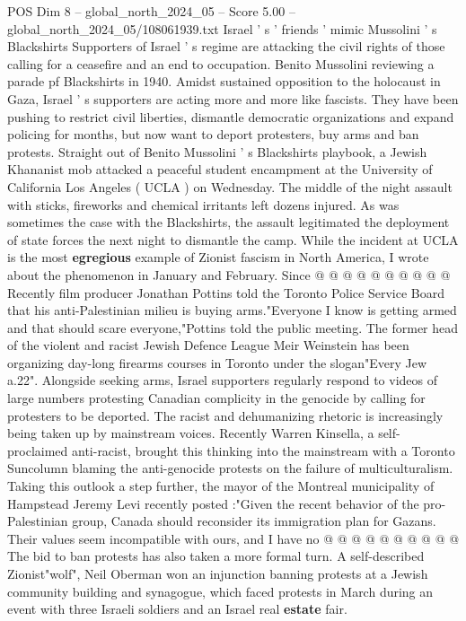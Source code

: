 \begin{textsample}{POS Dim 8 – global\_north\_2024\_05 – Score 5.00 – global\_north\_2024\_05/108061939.txt}  \label{ex:f8_pos_173}
Israel ' s ' friends ' mimic Mussolini ' s Blackshirts Supporters of Israel ' s regime are attacking the civil rights of those calling for a ceasefire and an end to occupation.
Benito Mussolini reviewing a parade pf Blackshirts in 1940.
Amidst sustained opposition to the holocaust in Gaza, Israel ' s supporters are acting more and more like fascists.
They have been pushing to restrict civil liberties, dismantle democratic organizations and expand policing for months, but now want to deport protesters, buy arms and ban protests.
Straight out of Benito Mussolini ' s Blackshirts playbook, a Jewish Khananist mob attacked a peaceful student encampment at the University of California Los Angeles ( UCLA ) on Wednesday.
The middle of the night assault with sticks, fireworks and chemical irritants left dozens injured.
As was sometimes the case with the Blackshirts, the assault legitimated the deployment of state forces the next night to dismantle the camp.
While the incident at UCLA is the most \textbf{egregious} example of Zionist fascism in North America, I wrote about the phenomenon in January and February.
Since @ @ @ @ @ @ @ @ @ @ Recently film producer Jonathan Pottins told the Toronto Police Service Board that his anti-Palestinian milieu is buying arms."Everyone I know is getting armed and that should scare everyone,"Pottins told the public meeting.
The former head of the violent and racist Jewish Defence League Meir Weinstein has been organizing day-long firearms courses in Toronto under the slogan"Every Jew a.22".
Alongside seeking arms, Israel supporters regularly respond to videos of large numbers protesting Canadian complicity in the genocide by calling for protesters to be deported.
The racist and dehumanizing rhetoric is increasingly being taken up by mainstream voices.
Recently Warren Kinsella, a self-proclaimed anti-racist, brought this thinking into the mainstream with a Toronto Suncolumn blaming the anti-genocide protests on the failure of multiculturalism.
Taking this outlook a step further, the mayor of the Montreal municipality of Hampstead Jeremy Levi recently posted :"Given the recent behavior of the pro-Palestinian group, Canada should reconsider its immigration plan for Gazans.
Their values seem incompatible with ours, and I have no @ @ @ @ @ @ @ @ @ @ The bid to ban protests has also taken a more formal turn.
A self-described Zionist"wolf", Neil Oberman won an injunction banning protests at a Jewish community building and synagogue, which faced protests in March during an event with three Israeli soldiers and an Israel real \textbf{estate} fair.

\end{textsample}
